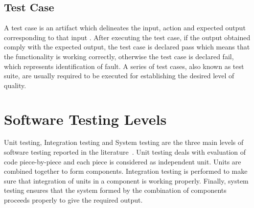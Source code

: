 \subsection{Test Case}
A test case is an artifact which delineates the input, action and expected output corresponding to that input \cite{ahmed2010software}. After executing the test case, if the output obtained comply with the expected output, the test case is declared pass which means that the functionality is working correctly, otherwise the test case is declared fail, which represents identification of fault. A series of test cases, also known as test suite, are usually required to be executed for establishing the desired level of quality.

\section{Software Testing Levels}
Unit testing, Integration testing and System testing are the three main levels of software testing reported in the literature~\cite{chilenski1994applicability}. Unit testing deals with evaluation of code piece-by-piece and each piece is considered as independent unit. Units are combined together to form components. Integration testing is performed to make sure that integration of units in a component is working properly. Finally, system testing ensures that the system formed by the combination of components proceeds properly to give the required output.

